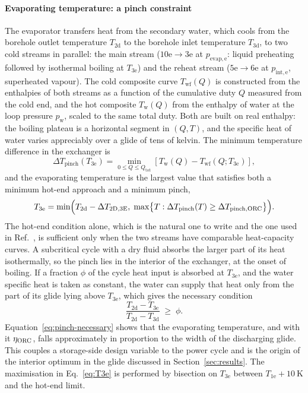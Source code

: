 \paragraph{Evaporating temperature: a pinch constraint}
The evaporator transfers heat from the secondary water, which cools from the
borehole outlet temperature $T_\mathrm{2d}$ to the borehole inlet temperature
$T_\mathrm{3d}$, to two cold streams in parallel: the main stream
($\mathrm{10e}\to\mathrm{3e}$ at $p_\mathrm{evap,e}$: liquid preheating
followed by isothermal boiling at $T_\mathrm{3e}$) and the reheat stream
($\mathrm{5e}\to\mathrm{6e}$ at $p_\mathrm{int,e}$, superheated vapour). The
cold composite curve $T_\mathrm{wf}(Q)$ is constructed from the enthalpies of
both streams as a function of the cumulative duty $Q$ measured from the cold
end, and the hot composite $T_\mathrm{w}(Q)$ from the enthalpy of water at the
loop pressure $p_\mathrm{w}$, scaled to the same total duty. Both are built on
real enthalpy: the boiling plateau is a horizontal segment in $(Q,T)$, and
the specific heat of water varies appreciably over a glide of tens of
kelvin. The minimum temperature difference in the exchanger is
\begin{equation}
  \Delta T_\mathrm{pinch}\left(T_\mathrm{3e}\right)=
  \min_{0\le Q\le Q_\mathrm{tot}}
  \left[T_\mathrm{w}(Q)-T_\mathrm{wf}(Q;T_\mathrm{3e})\right],
  \label{eq:pinch}
\end{equation}
and the evaporating temperature is the largest value that satisfies both a
minimum hot-end approach and a minimum pinch,
\begin{equation}
  T_\mathrm{3e}=\min\Bigl(T_\mathrm{2d}-\Delta T_\mathrm{2D,3E},\;
  \max\bigl\{T:\Delta T_\mathrm{pinch}(T)\ge\Delta T_\mathrm{pinch,ORC}\bigr\}
  \Bigr).
  \label{eq:T3e}
\end{equation}
The hot-end condition alone, which is the natural one to write and the one
used in Ref.~\cite{KoIHTC2026}, is sufficient only when the two streams have
comparable heat-capacity curves. A subcritical cycle with a dry fluid absorbs
the larger part of its heat isothermally, so the pinch lies in the interior of
the exchanger, at the onset of boiling. If a fraction $\phi$ of the cycle heat
input is absorbed at $T_\mathrm{3e}$, and the water specific heat is taken as
constant, the water can supply that heat only from the part of its glide lying
above $T_\mathrm{3e}$, which gives the necessary condition
\begin{equation}
  \frac{T_\mathrm{2d}-T_\mathrm{3e}}{T_\mathrm{2d}-T_\mathrm{3d}}\;\ge\;\phi.
  \label{eq:pinch-necessary}
\end{equation}
Equation~\eqref{eq:pinch-necessary} shows that the evaporating temperature,
and with it $\eta_{\mathrm{ORC}}$, falls approximately in proportion to the width of the
discharging glide. This couples a storage-side design variable to the power
cycle and is the origin of the interior optimum in the glide discussed in
Section~\ref{sec:results}. The maximisation in Eq.~\eqref{eq:T3e} is performed
by bisection on $T_\mathrm{3e}$ between $T_\mathrm{1e}+\SI{10}{\kelvin}$ and
the hot-end limit.

